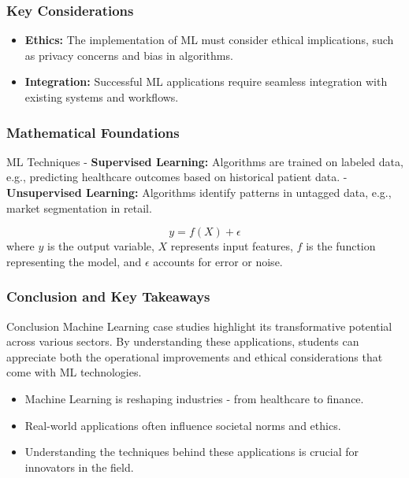 \documentclass[aspectratio=169]{beamer}
\begin{document}
\begin{frame}[fragile]
    \frametitle{Key Considerations}
    \begin{itemize}
        \item \textbf{Ethics:} The implementation of ML must consider ethical implications, such as privacy concerns and bias in algorithms.
        \item \textbf{Integration:} Successful ML applications require seamless integration with existing systems and workflows.
    \end{itemize}
\end{frame}

\begin{frame}[fragile]
    \frametitle{Mathematical Foundations}
    \begin{block}{ML Techniques}
        - \textbf{Supervised Learning:} Algorithms are trained on labeled data, e.g., predicting healthcare outcomes based on historical patient data.
        - \textbf{Unsupervised Learning:} Algorithms identify patterns in untagged data, e.g., market segmentation in retail.
    \end{block}
    \begin{equation}
        y = f(X) + \epsilon
    \end{equation}
    where \(y\) is the output variable, \(X\) represents input features, \(f\) is the function representing the model, and \(\epsilon\) accounts for error or noise.
\end{frame}

\begin{frame}[fragile]
    \frametitle{Conclusion and Key Takeaways}
    \begin{block}{Conclusion}
        Machine Learning case studies highlight its transformative potential across various sectors. By understanding these applications, students can appreciate both the operational improvements and ethical considerations that come with ML technologies.
    \end{block}
    \begin{itemize}
        \item Machine Learning is reshaping industries - from healthcare to finance.
        \item Real-world applications often influence societal norms and ethics.
        \item Understanding the techniques behind these applications is crucial for innovators in the field.
    \end{itemize}
\end{frame}
\end{document}

